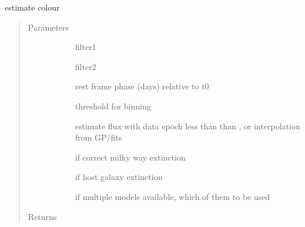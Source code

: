 \documentclass[letterpaper,10pt,english]{sphinxmanual}
\begin{document}
\begin{fulllineitems}
\label{\detokenize{generated/sdapy.snerun.snobject._color_at:sdapy.snerun.snobject._color_at}}
estimate colour
\begin{quote}\begin{description}
\item[{Parameters}] \leavevmode\begin{description}
\item[{}] \leavevmode{[}\sphinxtitleref{str}{]}
filter1

\item[{}] \leavevmode{[}\sphinxtitleref{str}{]}
filter2

\item[{}] \leavevmode{[}\sphinxtitleref{float}{]}
rest frame phase (days) relative to t0

\item[{}] \leavevmode{[}\sphinxtitleref{float}{]}
threshold for binning

\item[{}] \leavevmode{[}\sphinxtitleref{str}{]}
estimate flux with data epoch less than than , or interpolation from GP/fits

\item[{}] \leavevmode{[}\sphinxtitleref{bool}{]}
if correct milky way extinction

\item[{}] \leavevmode{[}\sphinxtitleref{bool}{]}
if host galaxy extinction

\item[{}] \leavevmode{[}\sphinxtitleref{int}{]}
if multiple models available, which of them to be used

\end{description}

\item[{Returns}] \leavevmode\begin{description}
\item[{}] \leavevmode{[}\sphinxtitleref{float}{]}
\item[{}] \leavevmode{[}\sphinxtitleref{float}{]}
\end{description}


\end{description}
\end{quote}
\end{fulllineitems}
\end{document}
